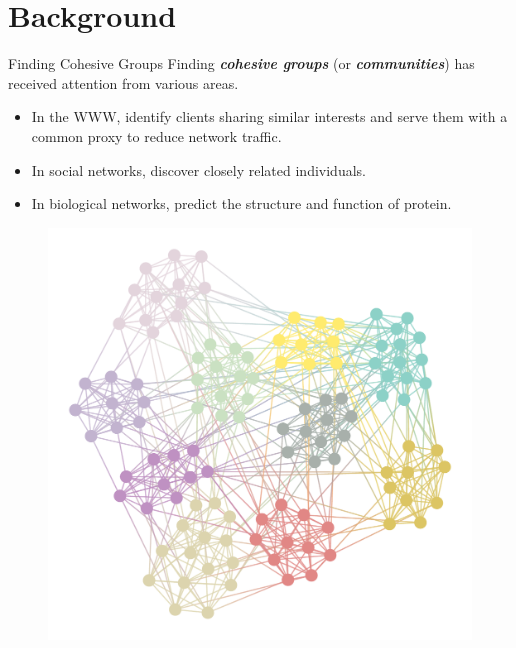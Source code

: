 \documentclass[9pt]{beamer} %
\begin{document}
\section{Background}
\begin{frame}{Finding Cohesive Groups}
    \vspace{0.5cm}
    Finding \textbf{\emph{cohesive groups}} (or \textbf{\emph{communities}}) has received attention from various areas.
    \begin{itemize}
	    \item In the WWW, identify clients sharing similar interests and serve them with a common proxy to reduce network traffic.
	    \item In social networks, discover closely related individuals.
		\item In biological networks, predict the structure and function of protein.
	\end{itemize}
    \begin{figure}[h]
    \centering
    \includegraphics[width=0.4\linewidth]{pic/cohesive_groups.pdf}
    \end{figure}
\end{frame}
\end{document}
